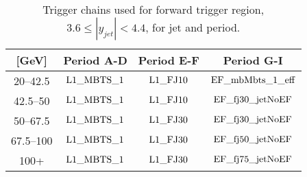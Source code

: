 \begin{table}[htdp]
\centering
\begin{tabular}{ | c | c | c | c | }
  \hline
 \pt{} [GeV] & Period A-D & Period E-F & Period G-I \\
  \hline
\rm 20--42.5 &       $\rm L1\_ MBTS\_ 1$ & $\rm L1\_ FJ10$ & $\rm EF\_ mbMbts\_ 1\_ eff$  \\
\rm 42.5--50 &       $\rm L1\_ MBTS\_ 1$ & $\rm L1\_ FJ10$ & $\rm EF\_ fj30\_ jetNoEF$  \\
\rm 50--67.5 &       $\rm L1\_ MBTS\_ 1$ & $\rm L1\_ FJ30$ & $\rm EF\_ fj30\_ jetNoEF$  \\
\rm 67.5--100 &      $\rm L1\_ MBTS\_ 1$ & $\rm L1\_ FJ30$ & $\rm EF\_ fj50\_ jetNoEF$  \\
\rm 100+ &           $\rm L1\_ MBTS\_ 1$ & $\rm L1\_ FJ30$ & $\rm EF\_ fj75\_ jetNoEF$  \\

  \hline
\end{tabular}
\caption[Triggers used for jets in the forward region]{
Trigger chains used for forward trigger region, $3.6\le|y_{jet}|<4.4$, for jet \pt{} and period.
\label{tab:ForwardTrigger}}
\end{table}%

